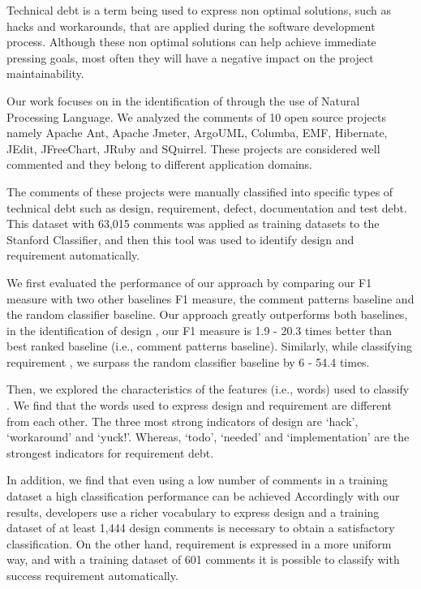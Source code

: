 Technical debt is a term being used to express non optimal solutions, such as hacks and workarounds, that are applied during the software development process. Although these non optimal solutions can help achieve immediate pressing goals, most often they will have a negative impact on the project maintainability. 

Our work focuses on in the identification of \SATD through the use of Natural Processing Language. We analyzed the comments of 10 open source projects namely Apache Ant, Apache Jmeter, ArgoUML, Columba, EMF, Hibernate, JEdit, JFreeChart, JRuby and SQuirrel. These projects are considered well commented and they belong to different application domains.

The comments of these projects were manually classified into specific types of technical debt such as design, requirement, defect, documentation and test debt. This dataset with 63,015 comments was applied as training datasets to the Stanford Classifier, and then this tool was used to identify  design and requirement \SATD automatically.

We first evaluated the performance of our approach by comparing our F1 measure with two other baselines F1 measure, the comment patterns baseline and the random classifier baseline. Our approach greatly outperforms both baselines, in the identification of design \SATD, our F1 measure is 1.9 - 20.3 times better than best ranked baseline (i.e., comment patterns baseline). Similarly, while classifying requirement \SATD, we surpass the random classifier baseline by 6 - 54.4 times.

Then, we explored the characteristics of the features (i.e., words) used to classify \SATD. We find that the words used to express design and requirement \SATD are different from each other. The three most strong indicators of design \SATD are `hack', `workaround' and `yuck!'. Whereas, `todo', `needed' and `implementation' are the strongest indicators for requirement debt.
 
In addition, we find that even using a low number of \SATD comments in a training dataset a high classification performance can be achieved Accordingly with our results, developers use a richer vocabulary to express design \SATD and a training dataset of at least 1,444 design \SATD comments is necessary to obtain a satisfactory classification. On the other hand, requirement \SATD is expressed in a more uniform way, and with a training dataset of 601 \SATD comments it is possible to classify with success requirement \SATD automatically.

